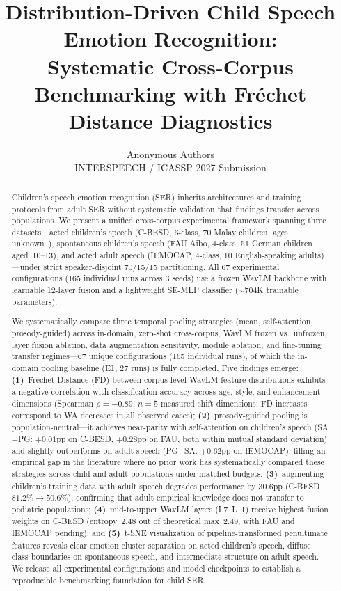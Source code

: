 \documentclass[11pt,a4paper]{article}
\title{Distribution-Driven Child Speech Emotion Recognition:\\
Systematic Cross-Corpus Benchmarking with Fr\'{e}chet Distance Diagnostics}
\author{Anonymous Authors\\
\small INTERSPEECH / ICASSP 2027 Submission}
\date{}
\begin{document}
\maketitle


\begin{abstract}
Children's speech emotion recognition (SER) inherits architectures and training
protocols from adult SER without systematic validation that findings transfer
across populations. We present a unified cross-corpus experimental framework
spanning three datasets---acted children's speech (C-BESD, 6-class, 70 Malay
children, ages unknown~\cite{rao2024cbesd}), spontaneous children's speech
(FAU Aibo, 4-class, 51 German children aged~10--13), and acted adult speech
(IEMOCAP, 4-class, 10 English-speaking
adults)---under strict speaker-disjoint 70/15/15 partitioning. All 67
experimental configurations (165 individual runs across 3 seeds) use a frozen
WavLM backbone with learnable 12-layer fusion and a lightweight SE-MLP
classifier ($\sim$704K trainable parameters).

We systematically compare three temporal pooling strategies (mean,
self-attention, prosody-guided) across in-domain, zero-shot cross-corpus,
WavLM frozen vs.\ unfrozen, layer fusion ablation, data augmentation
sensitivity, module ablation, and fine-tuning transfer regimes---67 unique
configurations (165 individual runs), of which the in-domain pooling baseline
(E1, 27 runs) is fully completed. Five findings emerge:
\textbf{(1)}~Fr\'{e}chet Distance (FD) between corpus-level WavLM feature
distributions exhibits a negative correlation with classification accuracy
across age, style, and enhancement dimensions (Spearman $\rho = -0.89$,
$n=5$ measured shift dimensions; FD increases correspond to WA decreases
in all observed cases);
\textbf{(2)}~prosody-guided pooling is population-neutral---it achieves
near-parity with self-attention on children's speech (SA$-$PG: $+0.01$pp on
C-BESD, $+0.28$pp on FAU, both within mutual standard deviation) and slightly
outperforms on adult speech (PG$-$SA: $+0.62$pp on IEMOCAP), filling an
empirical gap in the literature where no prior work has systematically compared
these strategies across child and adult populations under matched budgets;
\textbf{(3)}~augmenting children's training data with adult speech degrades
performance by $30.6$pp (C-BESD $81.2\% \rightarrow 50.6\%$), confirming that
adult empirical knowledge does not transfer to pediatric populations;
\textbf{(4)}~mid-to-upper WavLM layers (L7--L11) receive highest fusion weights
on C-BESD (entropy~2.48 out of theoretical max~2.49, with FAU and IEMOCAP
pending); and
\textbf{(5)}~t-SNE visualization of pipeline-transformed penultimate features
reveals clear emotion cluster separation on acted children's speech, diffuse
class boundaries on spontaneous speech, and intermediate structure on adult
speech. We release all experimental configurations and
model checkpoints to establish a reproducible benchmarking foundation for child
SER.
\end{abstract}
\end{document}
